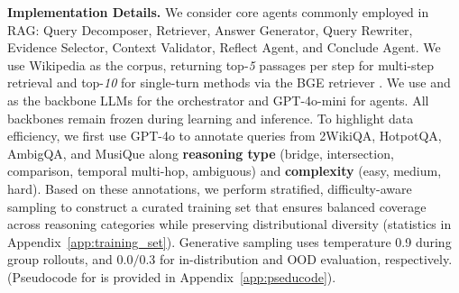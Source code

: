 \textbf{Implementation Details.} We consider core agents commonly employed in RAG: Query Decomposer, Retriever, Answer Generator, Query Rewriter, Evidence Selector, Context Validator, Reflect Agent, and Conclude Agent. We use Wikipedia as the corpus, returning top-\emph{5} passages per step for multi-step retrieval and top-\emph{10} for single-turn methods via the BGE retriever \citep{xiao2024c}. We use \llama \citep{grattafiori2024llama} and \qwen \citep{yang2025qwen3} as the backbone LLMs for the orchestrator and GPT-4o-mini for agents. All backbones remain frozen during learning and inference. To highlight data efficiency, we first use GPT-4o to annotate queries from 2WikiQA, HotpotQA, AmbigQA, and MusiQue along \textbf{reasoning type} (bridge, intersection, comparison, temporal multi-hop, ambiguous) and \textbf{complexity} (easy, medium, hard). Based on these annotations, we perform stratified, difficulty-aware sampling to construct a curated training set that ensures balanced coverage across reasoning categories while preserving distributional diversity (statistics in Appendix~\ref{app:training_set}). Generative sampling uses temperature 0.9 during group rollouts, and $0.0 / 0.3$ for in-distribution and OOD evaluation, respectively.  (Pseudocode for \hero is provided in Appendix~\ref{app:pseducode}).
